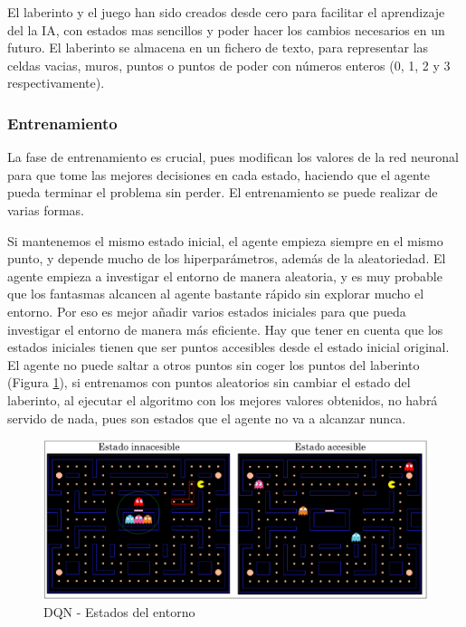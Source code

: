 		El laberinto y el juego han sido creados desde cero para facilitar el aprendizaje del la IA, con estados mas sencillos y poder hacer los cambios necesarios en un futuro. El laberinto se almacena en un fichero de texto, para representar las celdas vacias, muros, puntos o puntos de poder con números enteros (0, 1, 2 y 3 respectivamente).
		
		
		
		
		\subsubsection{Entrenamiento}
			
			La fase de entrenamiento es crucial, pues modifican los valores de la red neuronal para que tome las mejores decisiones en cada estado, haciendo que el agente pueda terminar el problema sin perder.	El entrenamiento se puede realizar de varias formas.	
			
							
			Si mantenemos el mismo estado inicial, el agente empieza siempre en el mismo punto, y depende mucho de los hiperparámetros, además de la aleatoriedad. El agente empieza a investigar el entorno de manera aleatoria, y es muy probable que los fantasmas alcancen al agente bastante rápido sin explorar mucho el entorno. Por eso es mejor añadir varios estados iniciales para que pueda investigar el entorno de manera más eficiente. Hay que tener en cuenta que los estados iniciales tienen que ser puntos accesibles desde el estado inicial original. El agente no puede saltar a otros puntos sin coger los puntos del laberinto (Figura \ref{fig:pacman_states}), si entrenamos con puntos aleatorios sin cambiar el estado del laberinto, al ejecutar el algoritmo con los mejores valores obtenidos, no habrá servido de nada, pues son estados que el agente no va a alcanzar nunca.
			
		
			\begin{figure}[!h]
				\centering
				\includegraphics[width=1\textwidth]{images/chapter_3/pacman_states}	
				\caption{DQN - Estados del entorno}
				\label{fig:pacman_states}
			\end{figure}
			
